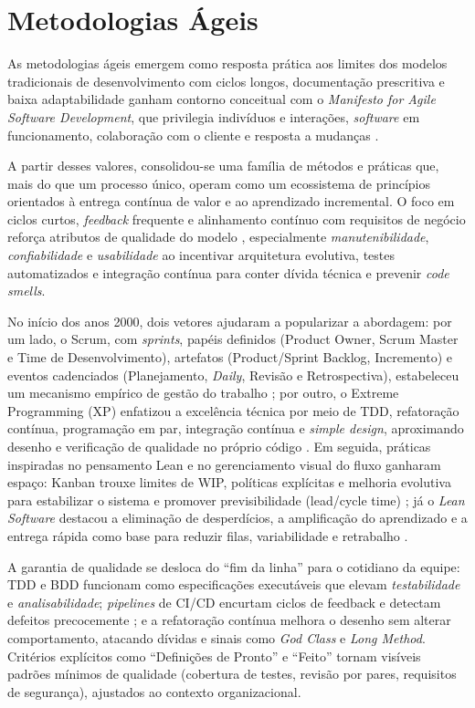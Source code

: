 \section{Metodologias Ágeis}
As metodologias ágeis emergem como resposta prática aos limites dos modelos tradicionais de desenvolvimento com ciclos longos, 
documentação prescritiva e baixa adaptabilidade ganham contorno conceitual com o \textit{Manifesto for Agile Software Development}, 
que privilegia indivíduos e interações, \textit{software} em funcionamento, colaboração com o cliente e resposta a mudanças \cite{Beck2001Manifesto}.

A partir desses valores, consolidou-se uma família de métodos e práticas que, mais do que um processo único, operam como um ecossistema de 
princípios orientados à entrega contínua de valor e ao aprendizado incremental. O foco em ciclos curtos, \textit{feedback} frequente e alinhamento
contínuo com requisitos de negócio reforça atributos de qualidade do modelo \cite{ISOIEC25010}, especialmente \emph{manutenibilidade}, 
\emph{confiabilidade} e \emph{usabilidade} ao incentivar arquitetura evolutiva, testes automatizados e integração contínua para conter 
dívida técnica e prevenir \textit{code smells}.

No início dos anos 2000, dois vetores ajudaram a popularizar a abordagem: por um lado, o Scrum, com \textit{sprints}, papéis definidos 
(Product Owner, Scrum Master e Time de Desenvolvimento), artefatos (Product/Sprint Backlog, Incremento) e eventos cadenciados 
(Planejamento, \textit{Daily}, Revisão e Retrospectiva), estabeleceu um mecanismo empírico de gestão do trabalho \cite{SchwaberSutherland2020}; 
por outro, o Extreme Programming (XP) enfatizou a excelência técnica por meio de TDD, refatoração contínua, programação em par, integração 
contínua e \textit{simple design}, aproximando desenho e verificação de qualidade no próprio código \cite{Beck2004XP}. Em seguida, práticas 
inspiradas no pensamento Lean e no gerenciamento visual do fluxo ganharam espaço: Kanban trouxe limites de WIP, políticas explícitas e 
melhoria evolutiva para estabilizar o sistema e promover previsibilidade (lead/cycle time) \cite{Anderson2010Kanban}; já o 
\textit{Lean Software} destacou a eliminação de desperdícios, a amplificação do aprendizado e a entrega rápida como base para 
reduzir filas, variabilidade e retrabalho \cite{Poppendieck2003Lean}. 

A garantia de qualidade se desloca do “fim da linha” para o cotidiano da equipe: TDD e BDD funcionam como especificações executáveis que elevam \emph{testabilidade} e \emph{analisabilidade}; 
\textit{pipelines} de CI/CD encurtam ciclos de feedback e detectam defeitos precocemente \cite{Fowler2006CI,HumbleFarley2010CD}; e a 
refatoração contínua melhora o desenho sem alterar comportamento, atacando dívidas e sinais como \emph{God Class} e \emph{Long Method}. 
Critérios explícitos como “Definições de Pronto” e “Feito” tornam visíveis padrões mínimos de qualidade (cobertura de testes, revisão por
pares, requisitos de segurança), ajustados ao contexto organizacional.

